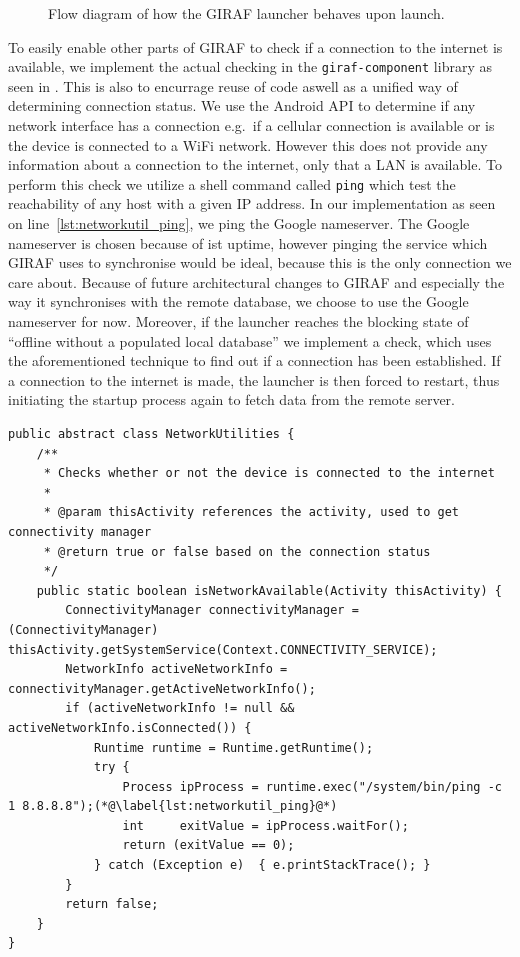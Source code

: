 \begin{figure}[h]
    \centering
    
    \caption{Flow diagram of how the GIRAF launcher behaves upon launch.}\label{fig:launcher_offline_flow}
\end{figure}

To easily enable other parts of GIRAF to check if a connection to the internet is available, we implement the actual checking in the \texttt{giraf-component} library as seen in .
This is also to encurrage reuse of code aswell as a unified way of determining connection status.
We use the Android API to determine if any network interface has a connection e.g.\ if a cellular connection is available or is the device is connected to a WiFi network.
However this does not provide any information about a connection to the internet, only that a LAN is available.
To perform this check we utilize a shell command called \texttt{ping} which test the reachability of any host with a given IP address.
In our implementation as seen on line~\ref{lst:networkutil_ping}, we ping the Google nameserver.
The Google nameserver is chosen because of ist uptime, however pinging the service which GIRAF uses to synchronise would be ideal, because this is the only connection we care about.
Because of future architectural changes to GIRAF and especially the way it synchronises with the remote database, we choose to use the Google nameserver for now.
Moreover, if the launcher reaches the blocking state of \enquote{offline without a populated local database} we implement a check, which uses the aforementioned technique to find out if a connection has been established.
If a connection to the internet is made, the launcher is then forced to restart, thus initiating the startup process again to fetch data from the remote server.

\begin{lstlisting}[float, caption={The class from the \texttt{giraf-component} library where network utilities are implemented, such as the method used to check if a connection to the internet is available}, label={lst:networkutil}]
public abstract class NetworkUtilities {
    /**
     * Checks whether or not the device is connected to the internet
     *
     * @param thisActivity references the activity, used to get connectivity manager
     * @return true or false based on the connection status
     */
    public static boolean isNetworkAvailable(Activity thisActivity) {
        ConnectivityManager connectivityManager = (ConnectivityManager) thisActivity.getSystemService(Context.CONNECTIVITY_SERVICE);
        NetworkInfo activeNetworkInfo = connectivityManager.getActiveNetworkInfo();
        if (activeNetworkInfo != null && activeNetworkInfo.isConnected()) {
            Runtime runtime = Runtime.getRuntime();
            try {
                Process ipProcess = runtime.exec("/system/bin/ping -c 1 8.8.8.8");(*@\label{lst:networkutil_ping}@*)
                int     exitValue = ipProcess.waitFor();
                return (exitValue == 0);
            } catch (Exception e)  { e.printStackTrace(); }
        }
        return false;
    }
}
\end{lstlisting}


